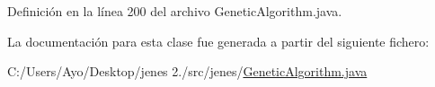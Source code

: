 Definición en la línea 200 del archivo Genetic\-Algorithm.\-java.



La documentación para esta clase fue generada a partir del siguiente fichero\-:\begin{DoxyCompactItemize}
\item 
C\-:/\-Users/\-Ayo/\-Desktop/jenes 2./src/jenes/\hyperlink{_genetic_algorithm_8java}{Genetic\-Algorithm.\-java}\end{DoxyCompactItemize}
